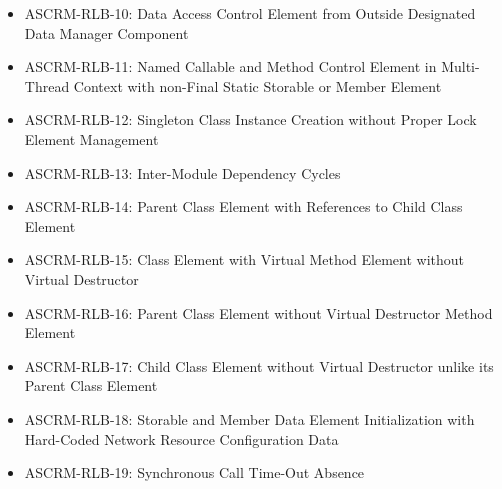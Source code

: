 \documentclass[openany,10pt,a4paper]{article}
\begin{document}
\begin{appendix}
\begin{itemize}
	\item ASCRM-RLB-10: Data Access Control Element from Outside Designated Data Manager Component
	\item ASCRM-RLB-11: Named Callable and Method Control Element in Multi-Thread Context with non-Final Static Storable or Member Element
	\item ASCRM-RLB-12: Singleton Class Instance Creation without Proper Lock Element Management
	\item ASCRM-RLB-13: Inter-Module Dependency Cycles
	\item ASCRM-RLB-14: Parent Class Element with References to Child Class Element
	\item ASCRM-RLB-15: Class Element with Virtual Method Element without Virtual Destructor
	\item ASCRM-RLB-16: Parent Class Element without Virtual Destructor Method Element
	\item ASCRM-RLB-17: Child Class Element without Virtual Destructor unlike its Parent Class Element
	\item ASCRM-RLB-18: Storable and Member Data Element Initialization with Hard-Coded Network Resource Configuration Data
	\item ASCRM-RLB-19: Synchronous Call Time-Out Absence
\end{itemize}








\end{appendix}
\end{document}
